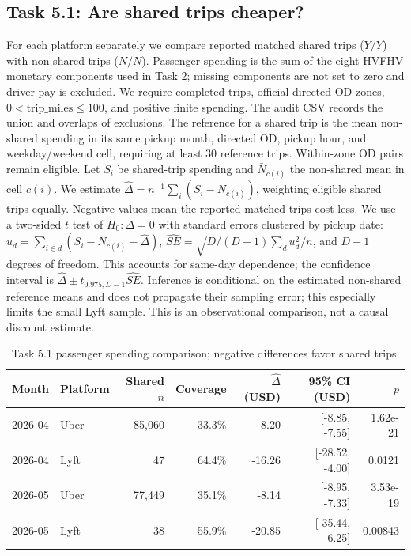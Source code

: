\subsection{Task 5.1: Are shared trips cheaper?}
For each platform separately we compare reported matched shared trips ($Y/Y$) with non-shared trips ($N/N$). Passenger spending is the sum of the eight HVFHV monetary components used in Task 2; missing components are not set to zero and driver pay is excluded. We require completed trips, official directed OD zones, $0<\mathrm{trip\_miles}\leq100$, and positive finite spending. The audit CSV records the union and overlaps of exclusions. The reference for a shared trip is the mean non-shared spending in its same pickup month, directed OD, pickup hour, and weekday/weekend cell, requiring at least 30 reference trips. Within-zone OD pairs remain eligible.
Let $S_i$ be shared-trip spending and $\bar N_{c(i)}$ the non-shared mean in cell $c(i)$. We estimate $\hat\Delta=n^{-1}\sum_i(S_i-\bar N_{c(i)})$, weighting eligible shared trips equally. Negative values mean the reported matched trips cost less. We use a two-sided $t$ test of $H_0:\Delta=0$ with standard errors clustered by pickup date: $u_d=\sum_{i\in d}(S_i-\bar N_{c(i)}-\hat\Delta)$, $\widehat{SE}=\sqrt{D/(D-1)\sum_d u_d^2}/n$, and $D-1$ degrees of freedom. This accounts for same-day dependence; the confidence interval is $\hat\Delta\pm t_{0.975,D-1}\widehat{SE}$. Inference is conditional on the estimated non-shared reference means and does not propagate their sampling error; this especially limits the small Lyft sample. This is an observational comparison, not a causal discount estimate.
\begin{table}[htbp]\centering\small\caption{Task 5.1 passenger spending comparison; negative differences favor shared trips.}\label{tab:t5price}\begin{tabular}{llrrrrr}\hline Month & Platform & Shared $n$ & Coverage & $\hat\Delta$ (USD) & 95\% CI (USD) & $p$ \\ \hline
2026-04 & Uber & 85,060 & 33.3\% & -8.20 & [-8.85, -7.55] & 1.62e-21 \\
2026-04 & Lyft & 47 & 64.4\% & -16.26 & [-28.52, -4.00] & 0.0121 \\
2026-05 & Uber & 77,449 & 35.1\% & -8.14 & [-8.95, -7.33] & 3.53e-19 \\
2026-05 & Lyft & 38 & 55.9\% & -20.85 & [-35.44, -6.25] & 0.00843 \\
\hline\end{tabular}\end{table}

